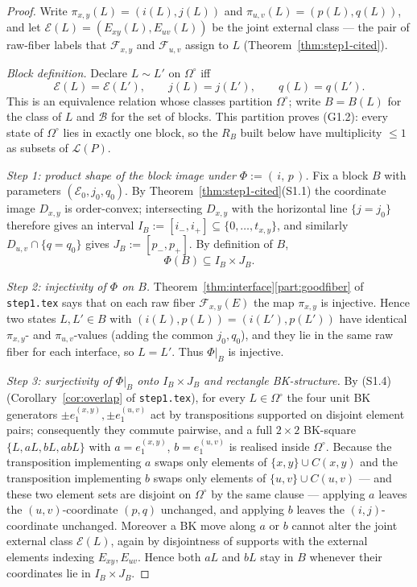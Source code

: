 \begin{proof}
Write $\pi_{x,y}(L)=(i(L),j(L))$ and $\pi_{u,v}(L)=(p(L),q(L))$, and
let $\mathcal E(L)=(E_{xy}(L),E_{uv}(L))$ be the joint external
class --- the pair of raw-fiber labels that $\mathcal F_{x,y}$ and
$\mathcal F_{u,v}$ assign to $L$ (Theorem~\ref{thm:step1-cited}).

\emph{Block definition.}
Declare $L\sim L'$ on $\Omega^\circ$ iff
\[
\mathcal E(L)=\mathcal E(L'),\qquad j(L)=j(L'),\qquad q(L)=q(L').
\]
This is an equivalence relation whose classes partition $\Omega^\circ$;
write $B=B(L)$ for the class of $L$ and $\mathcal B$ for the set of
blocks. This partition proves (G1.2): every state of $\Omega^\circ$
lies in exactly one block, so the $R_B$ built below have multiplicity
$\le 1$ as subsets of $\mathcal L(P)$.

\emph{Step 1: product shape of the block image under
$\Phi:=(\,i,\,p\,)$.}
Fix a block $B$ with parameters $(\mathcal E_0,j_0,q_0)$. By
Theorem~\ref{thm:step1-cited}(S1.1) the coordinate image $D_{x,y}$ is
order-convex; intersecting $D_{x,y}$ with the horizontal line
$\{j=j_0\}$ therefore gives an interval
$I_B:=[i_-,i_+]\subseteq\{0,\dots,t_{x,y}\}$, and similarly
$D_{u,v}\cap\{q=q_0\}$ gives $J_B:=[p_-,p_+]$. By definition of $B$,
\[
\Phi(B)\subseteq I_B\times J_B.
\]

\emph{Step 2: injectivity of $\Phi$ on $B$.}
Theorem~\ref{thm:interface}\ref{part:goodfiber} of \texttt{step1.tex}
says that on each raw fiber $\mathcal F_{x,y}(E)$ the map $\pi_{x,y}$
is injective. Hence two states $L,L'\in B$ with
$(i(L),p(L))=(i(L'),p(L'))$ have identical $\pi_{x,y}$- and
$\pi_{u,v}$-values (adding the common $j_0,q_0$), and they lie in
the same raw fiber for each interface, so $L=L'$. Thus $\Phi|_B$ is
injective.

\emph{Step 3: surjectivity of $\Phi|_B$ onto $I_B\times J_B$ and
rectangle BK-structure.}
By (S1.4) (Corollary~\ref{cor:overlap} of \texttt{step1.tex}), for
every $L\in\Omega^\circ$ the four unit BK generators
$\pm e_1^{(x,y)},\pm e_1^{(u,v)}$ act by transpositions supported on
disjoint element pairs; consequently they commute pairwise, and a
full $2\times2$ BK-square $\{L,aL,bL,abL\}$ with
$a=e_1^{(x,y)}$, $b=e_1^{(u,v)}$ is realised inside
$\Omega^\circ$. Because the transposition implementing $a$ swaps only
elements of $\{x,y\}\cup C(x,y)$ and the transposition implementing
$b$ swaps only elements of $\{u,v\}\cup C(u,v)$ --- and these two
element sets are disjoint on $\Omega^\circ$ by the same clause ---
applying $a$ leaves the $(u,v)$-coordinate $(p,q)$ unchanged, and
applying $b$ leaves the $(i,j)$-coordinate unchanged. Moreover a BK
move along $a$ or $b$ cannot alter the joint external class
$\mathcal E(L)$, again by disjointness of supports with the external
elements indexing $E_{xy},E_{uv}$. Hence both $aL$ and $bL$ stay in
$B$ whenever their coordinates lie in $I_B\times J_B$.


\end{proof}
